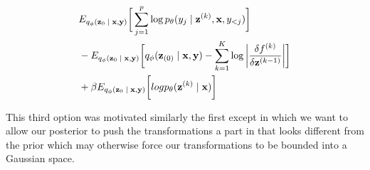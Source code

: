\begin{align}
\begin{split}\label{eq:2}
&
E_{q_{\phi}(\textbf{z}_{0}\; | \;{\textbf{x}, \textbf{y}})} \bigg[ \sum_{j=1}^{p} \log p_{\theta}(y_{j} \; | \;{\textbf{z}^{(k)}}, \textbf{x}, y_{<j}) \bigg] \\
& - E_{q_{\phi}(\textbf{z}_{0}\; | \;{\textbf{x}, \textbf{y}})}  \bigg[ q_{\phi}(\textbf{z}_{(0)} \; | \;{\textbf{x}, \textbf{y}}) - \sum_{k=1}^{K} \log \bigg|\frac{\delta f^{(k)}}{\delta \textbf{z}^{(k-1)}} \bigg| \bigg] \\
&   +  \beta E_{q_{\phi}(\textbf{z}_{0} \; | \;{\textbf{x}, \textbf{y}})} \bigg[log p_{\theta}(\textbf{z}^{(k)} \; | \;{\textbf{x}}) \bigg]  
\end{split}
\end{align}

This third option was motivated similarly the first except in which we want to allow our posterior to push the transformations a part in that looks different from the prior which may otherwise force our transformations to be bounded into a Gaussian space. 
